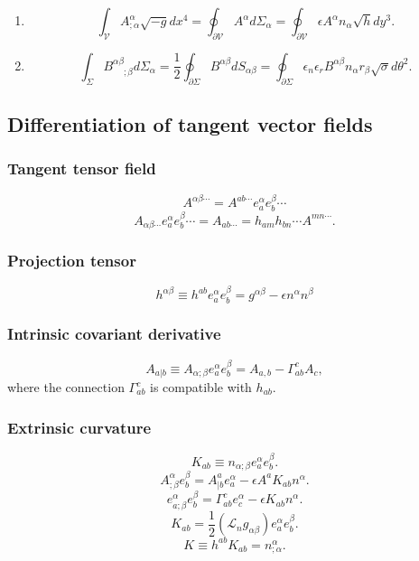 \begin{newthem}
\begin{enumerate} 
\item \[\int_{\mathcal{V}} A^{\alpha}_{;\alpha} \sqrt{-g} dx^4 = \oint_{\partial \mathcal{V}} A^{\alpha} d\Sigma_{\alpha} = \oint_{\partial \mathcal{V}} \epsilon A^{\alpha} n_{\alpha} \sqrt{h} dy^3.\]
\item \[\int_{\Sigma} B^{\alpha \beta}_{\phantom{\alpha \beta};\beta} d\Sigma_{\alpha} = \frac{1}{2}\oint_{\partial \Sigma} B^{\alpha \beta} dS_{\alpha \beta} = \oint_{\partial \Sigma} \epsilon_n \epsilon_r B^{\alpha \beta} n_{\alpha} r_{\beta} \sqrt{\sigma} d\theta^2.\]
\end{enumerate}
\end{newthem}

\subsection{Differentiation of tangent vector fields}
\subsubsection{Tangent tensor field}
\[A^{\alpha \beta \cdots} = A^{ab\cdots} e_a^{\alpha} e_b^{\beta} \cdots\]
\[A_{\alpha \beta \cdots} e_a^{\alpha} e_b^{\beta} \cdots = A_{ab\cdots} = h_{am} h_{bn} \cdots A^{mn\cdots}.\]
\subsubsection{Projection tensor}
\[h^{\alpha \beta} \equiv h^{ab}e_a^{\alpha} e_b^{\beta} = g^{\alpha \beta} - \epsilon n^{\alpha} n^{\beta}\]
\subsubsection{Intrinsic covariant derivative}
\[A_{a|b} \equiv A_{\alpha;\beta} e_a^{\alpha} e_b^{\beta} = A_{a,b} - \Gamma^c_{ab}A_c,\]
where the connection $\Gamma^c_{ab}$ is compatible with $h_{ab}$.
\subsubsection{Extrinsic curvature}
\[K_{ab} \equiv n_{\alpha;\beta}e_a^{\alpha} e_b^{\beta}.\]
\[A^{\alpha}_{;\beta} e_b^{\beta} = A^a_{|b} e_a^{\alpha} - \epsilon A^a K_{ab}n^{\alpha}.\]
\[e^{\alpha}_{a;\beta} e_b^{\beta} = \Gamma^c_{ab}e_c^{\alpha} - \epsilon K_{ab}n^{\alpha}.\]
\[K_{ab} = \frac{1}{2}(\mathcal{L}_n g_{\alpha \beta})e_a^{\alpha} e_b^{\beta}.\]
\[K \equiv h^{ab}K_{ab} = n^{\alpha}_{;\alpha}.\]

